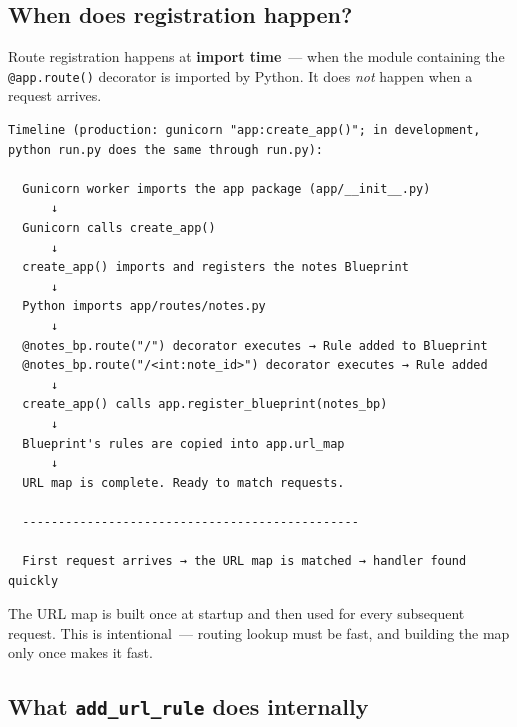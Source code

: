 \subsection*{When does registration happen?}\label{32-routing:when-does-registration-happen}

Route registration happens at \textbf{import time}~--- when the module containing the \texttt{@app.route()} decorator is imported by Python. It does \emph{not} happen when a request arrives.

\begin{outputbox}
\begin{Verbatim}[fontsize=\codesize, breaklines, breakanywhere, breaksymbolleft={\tiny\textcolor{muted}{$\hookrightarrow$}}]
Timeline (production: gunicorn "app:create_app()"; in development,
python run.py does the same through run.py):

  Gunicorn worker imports the app package (app/__init__.py)
      ↓
  Gunicorn calls create_app()
      ↓
  create_app() imports and registers the notes Blueprint
      ↓
  Python imports app/routes/notes.py
      ↓
  @notes_bp.route("/") decorator executes → Rule added to Blueprint
  @notes_bp.route("/<int:note_id>") decorator executes → Rule added
      ↓
  create_app() calls app.register_blueprint(notes_bp)
      ↓
  Blueprint's rules are copied into app.url_map
      ↓
  URL map is complete. Ready to match requests.

  -----------------------------------------------

  First request arrives → the URL map is matched → handler found quickly
\end{Verbatim}
\end{outputbox}

\noindent{}The URL map is built once at startup and then used for every subsequent request. This is intentional~--- routing lookup must be fast, and building the map only once makes it fast.

\subsection*{\texorpdfstring{What \texttt{add\_url\_rule} does internally}{What add\_url\_rule does internally}}\label{32-routing:what-add-url-rule-does-internally}

